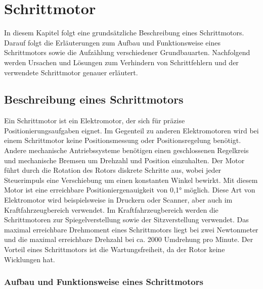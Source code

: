 %
%
%

	

\chapter{Schrittmotor}

In diesem Kapitel folgt eine grundsätzliche Beschreibung eines Schrittmotors. Darauf folgt die Erläuterungen zum Aufbau und Funktionsweise eines Schrittmotors sowie die Aufzählung verschiedener Grundbauarten. Nachfolgend werden Ursachen und Lösungen zum Verhindern von Schrittfehlern und der verwendete Schrittmotor genauer erläutert.

\section{Beschreibung eines Schrittmotors}

Ein Schrittmotor ist ein Elektromotor, der sich für präzise Positionierungsaufgaben eignet. Im Gegenteil zu anderen Elektromotoren wird bei einem Schrittmotor keine Positionsmessung oder Positionsregelung benötigt. Andere mechanische Antriebssysteme benötigen einen geschlossenen Regelkreis und mechanische Bremsen um Drehzahl und Position einzuhalten. Der Motor führt durch die Rotation des Rotors diskrete Schritte aus, wobei jeder Steuerimpuls eine Verschiebung um einen konstanten Winkel bewirkt. Mit diesem Motor ist eine erreichbare Positioniergenauigkeit von 0,1° möglich. Diese Art von Elektromotor wird beispielsweise in Druckern oder Scanner, aber auch im Kraftfahrzeugbereich verwendet. Im Kraftfahrzeugbereich werden die Schrittmotoren zur Spiegelverstellung sowie der Sitzverstellung verwendet. Das maximal erreichbare Drehmoment eines Schrittmotors liegt bei zwei Newtonmeter und die maximal erreichbare Drehzahl bei ca. 2000 Umdrehung pro Minute. Der Vorteil eines Schrittmotors ist die Wartungsfreiheit, da der Rotor keine Wicklungen hat. \cite{Babiel:2023,Hagl:2021,Bernstein:2018,Schroeder:2021}

\subsection{Aufbau und Funktionsweise eines Schrittmotors}

